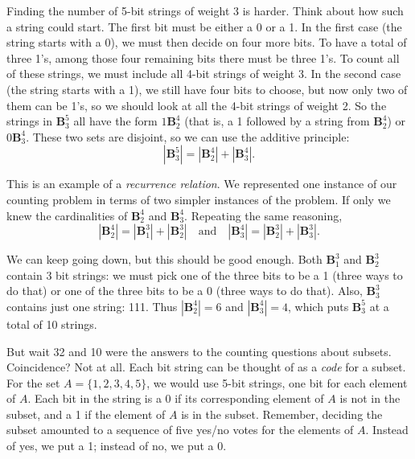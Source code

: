 \documentclass[10pt,]{book}
\theoremstyle{plain}
\theoremstyle{definition}
\theoremstyle{definition}
\theoremstyle{definition}
\numberwithin{equation}{section}
\def\B{\mathbf{B}}
\begin{document}
        Finding the number of 5-bit strings of weight 3 is harder. Think about how such a string could start. The first bit must be either a 0 or a 1. In the first case (the string starts with a 0), we must then decide on four more bits. To have a total of three 1's, among those four remaining bits there must be three 1's. To count all of these strings, we must include all 4-bit strings of weight 3. In the second case (the string starts with a 1), we still have four bits to choose, but now only two of them can be 1's, so we should look at all the 4-bit strings of weight 2. So the strings in \(\B^5_3\) all have the form \(1\B^4_2\) (that is, a 1 followed by a string from \(\B^4_2\)) or \(0\B^4_3\). These two sets are disjoint, so we can use the additive principle:
        \begin{equation*}
          |\B^5_3| = |\B^4_2| + |\B^4_3|.
        \end{equation*}
\par

        This is an example of a \emph{recurrence relation}. We represented one instance of our counting problem in terms of two simpler instances of the problem. If only we knew the cardinalities of \(\B^4_2\) and \(\B^4_3\). Repeating the same reasoning,
        \begin{equation*}
          |\B^4_2| = |\B^3_1| + |\B^3_2| \quad \mbox{and} \quad |\B^4_3| = |\B^3_2| + |\B^3_3|.
        \end{equation*}
\par

        We can keep going down, but this should be good enough. Both \(\B^3_1\) and \(\B^3_2\) contain 3 bit strings: we must pick one of the three bits to be a 1 (three ways to do that) or one of the three bits to be a 0 (three ways to do that). Also, \(\B^3_3\) contains just one string: 111. Thus \(|\B^4_2| = 6\) and \(|\B^4_3| = 4\), which puts \(\B^5_3\) at a total of 10 strings.
\par

        But wait
        \textemdash{}32 and 10 were the answers to the counting questions about subsets. Coincidence? Not at all. Each bit string can be thought of as a \emph{code} for a subset. For the set \(A = \{1,2,3,4,5\}\), we would use 5-bit strings, one bit for each element of \(A\). Each bit in the string is a 0 if its corresponding element of \(A\) is not in the subset, and a 1 if the element of \(A\) is in the subset. Remember, deciding the subset amounted to a sequence of five yes/no votes for the elements of \(A\). Instead of yes, we put a 1; instead of no, we put a 0.
\par
\end{document}
